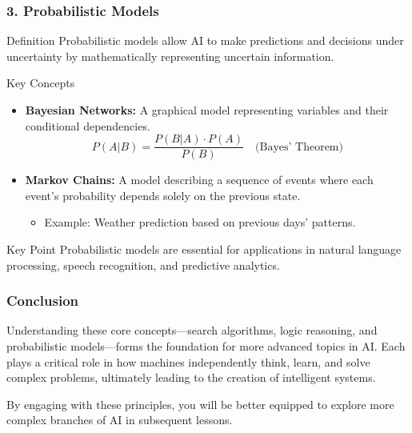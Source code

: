 \documentclass[aspectratio=169]{beamer}
\begin{document}
\begin{frame}[fragile]
    \frametitle{3. Probabilistic Models}
    \begin{block}{Definition}
        Probabilistic models allow AI to make predictions and decisions under uncertainty by mathematically representing uncertain information.
    \end{block}

    \begin{block}{Key Concepts}
        \begin{itemize}
            \item \textbf{Bayesian Networks:} A graphical model representing variables and their conditional dependencies. \\
            \begin{equation}
                P(A | B) = \frac{P(B | A) \cdot P(A)}{P(B)} \quad \text{(Bayes’ Theorem)}
            \end{equation}
            \item \textbf{Markov Chains:} A model describing a sequence of events where each event's probability depends solely on the previous state.
                \begin{itemize}
                    \item Example: Weather prediction based on previous days' patterns.
                \end{itemize}
        \end{itemize}
    \end{block}
    
    \begin{block}{Key Point}
        Probabilistic models are essential for applications in natural language processing, speech recognition, and predictive analytics.
    \end{block}
\end{frame}

\begin{frame}[fragile]
    \frametitle{Conclusion}
    Understanding these core concepts—search algorithms, logic reasoning, and probabilistic models—forms the foundation for more advanced topics in AI. Each plays a critical role in how machines independently think, learn, and solve complex problems, ultimately leading to the creation of intelligent systems.

    By engaging with these principles, you will be better equipped to explore more complex branches of AI in subsequent lessons.
\end{frame}
\end{document}
